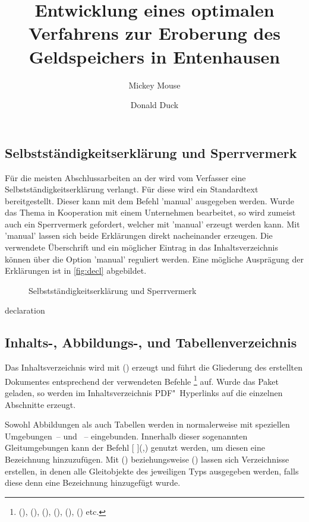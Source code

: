 \documentclass[%
  english,ngerman,%
  cdgeometry=no,DIV=12,%
  cd=false,cdfont=false,cdtitle=true,%
  headings=normal,%
  automark,%
  listof=toc,%
]{tudscrartcl}
\begin{document}
\subsection{Selbstständigkeitserklärung und Sperrvermerk}
Für die meisten Abschlussarbeiten an der \TnUD wird vom Verfasser eine 
Selbstständigkeitserklärung verlangt. Für diese wird ein Standardtext 
bereitgestellt. Dieser kann mit dem Befehl 'manual' 
ausgegeben werden. Wurde das Thema in Kooperation mit einem Unternehmen 
bearbeitet, so wird zumeist auch ein Sperrvermerk gefordert, welcher mit 
'manual' erzeugt werden kann. Mit 'manual' 
lassen sich beide Erklärungen direkt nacheinander erzeugen. Die verwendete 
Überschrift und ein möglicher Eintrag in das Inhaltsverzeichnis können über die 
Option 'manual' reguliert werden. Eine mögliche Ausprägung 
der Erklärungen ist in \autoref{fig:decl} abgebildet.
%
\begin{figure}
\centering
{}
\caption{Selbstständigkeitserklärung und Sperrvermerk}
\label{fig:decl}
\end{figure}

\begin{Hint!}{declaration}
\title{%
  Entwicklung eines optimalen Verfahrens zur Eroberung des
  Geldspeichers in Entenhausen
}
\author{Mickey Mouse\and Donald Duck}
\declaration[company=FIRMA]
\end{Hint!}
\begin{Trunk+}
\declaration[company=FIRMA]

\end{Trunk+}

\subsection{Inhalts-, Abbildungs-, und Tabellenverzeichnis}
Das Inhaltsverzeichnis wird mit () 
erzeugt und führt die Gliederung des erstellten Dokumentes entsprechend der 
verwendeten Befehle%
\footnote{%
  (),
  (), 
  (), 
  (), 
  (),
  () etc.%
}
auf. Wurde das Paket  geladen, so werden im 
Inhaltsverzeichnis PDF"~Hyperlinks auf die einzelnen Abschnitte erzeugt.

Sowohl Abbildungen als auch Tabellen werden in  normalerweise 
mit speziellen Umgebungen~--  und ~-- 
eingebunden. Innerhalb dieser sogenannten Gleitumgebungen kann der Befehl 
[%
](,) genutzt werden, um diesen eine 
Bezeichnung hinzuzufügen. Mit () 
beziehungsweise () lassen sich 
Verzeichnisse erstellen, in denen alle Gleitobjekte des jeweiligen Typs 
ausgegeben werden, falls diese denn eine Bezeichnung hinzugefügt wurde. 
\end{document}
